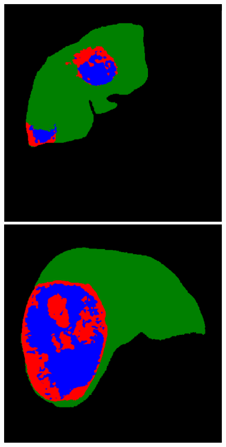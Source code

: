 \begin{figure}[!ht]
\begin{minipage}{4cm}
\end{minipage} 
\vspace{-0.2cm}
\begin{minipage}{4cm}
\includegraphics[width=\linewidth]{./images/1_21_FullDMP_resized}
\end{minipage} \hspace{-0.3cm}
\begin{minipage}{4cm}
\includegraphics[width=\linewidth]{./images/5_2_FullDMP_resized}

\end{minipage}
\end{figure}
